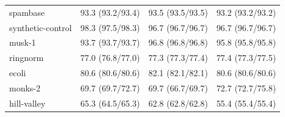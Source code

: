 \begin{table}
\begin{small}
\begin{tabular}{lccc}
            spambase             & 93.3 (93.2/93.4) & 93.5 (93.5/93.5)        & 93.2 (93.2/93.2)       \\
            synthetic-control    & 98.3 (97.5/98.3) & 96.7 (96.7/96.7)        & 96.7 (96.7/96.7)       \\
            musk-1               & 93.7 (93.7/93.7) & 96.8 (96.8/96.8)        & 95.8 (95.8/95.8)       \\
            ringnorm             & 77.0 (76.8/77.0) & 77.3 (77.3/77.4)        & 77.4 (77.3/77.5)       \\
            ecoli                & 80.6 (80.6/80.6) & 82.1 (82.1/82.1)        & 80.6 (80.6/80.6)       \\
            monks-2              & 69.7 (69.7/72.7) & 69.7 (66.7/69.7)        & 72.7 (72.7/75.8)       \\
            hill-valley          & 65.3 (64.5/65.3) & 62.8 (62.8/62.8)        & 55.4 (55.4/55.4)       \\ \bottomrule
        \end{tabular}
    \end{small}
\end{table}
